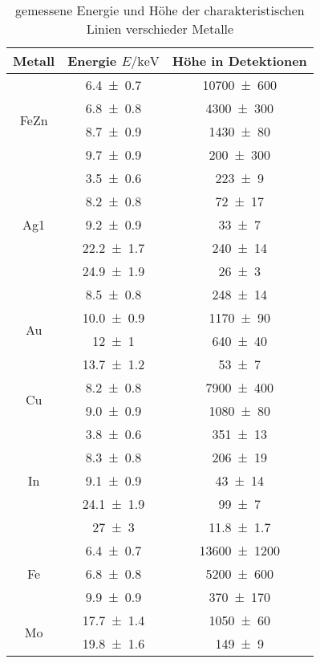 
\begin{table}[H]
    \centering
    \caption{gemessene Energie und Höhe der charakteristischen Linien verschieder Metalle}
    \label{tab:tab:energien-charakeristische-linien}
    \begin{tabular}{c|c|c}
        Metall & Energie $E/\unit{\kilo\electronvolt}$ & Höhe in Detektionen \\\hline\multirow{4}{*}{FeZn} & \num{6.4\pm 0.7} & \num{10700\pm 600} \\ & \num{6.8\pm 0.8} & \num{4300\pm 300} \\ & \num{8.7\pm 0.9} & \num{1430\pm 80} \\ & \num{9.7\pm 0.9} & \num{200\pm 300} \\\hline
\multirow{5}{*}{Ag1} & \num{3.5\pm 0.6} & \num{223\pm 9} \\ & \num{8.2\pm 0.8} & \num{72\pm 17} \\ & \num{9.2\pm 0.9} & \num{33\pm 7} \\ & \num{22.2\pm 1.7} & \num{240\pm 14} \\ & \num{24.9\pm 1.9} & \num{26\pm 3} \\\hline
\multirow{4}{*}{Au} & \num{8.5\pm 0.8} & \num{248\pm 14} \\ & \num{10.0\pm 0.9} & \num{1170\pm 90} \\ & \num{12\pm 1} & \num{640\pm 40} \\ & \num{13.7\pm 1.2} & \num{53\pm 7} \\\hline
\multirow{2}{*}{Cu} & \num{8.2\pm 0.8} & \num{7900\pm 400} \\ & \num{9.0\pm 0.9} & \num{1080\pm 80} \\\hline
\multirow{5}{*}{In} & \num{3.8\pm 0.6} & \num{351\pm 13} \\ & \num{8.3\pm 0.8} & \num{206\pm 19} \\ & \num{9.1\pm 0.9} & \num{43\pm 14} \\ & \num{24.1\pm 1.9} & \num{99\pm 7} \\ & \num{27\pm 3} & \num{11.8\pm 1.7} \\\hline
\multirow{3}{*}{Fe} & \num{6.4\pm 0.7} & \num{13600\pm 1200} \\ & \num{6.8\pm 0.8} & \num{5200\pm 600} \\ & \num{9.9\pm 0.9} & \num{370\pm 170} \\\hline
\multirow{2}{*}{Mo} & \num{17.7\pm 1.4} & \num{1050\pm 60} \\ & \num{19.8\pm 1.6} & \num{149\pm 9} \\\hline

\end{tabular}
\end{table}
